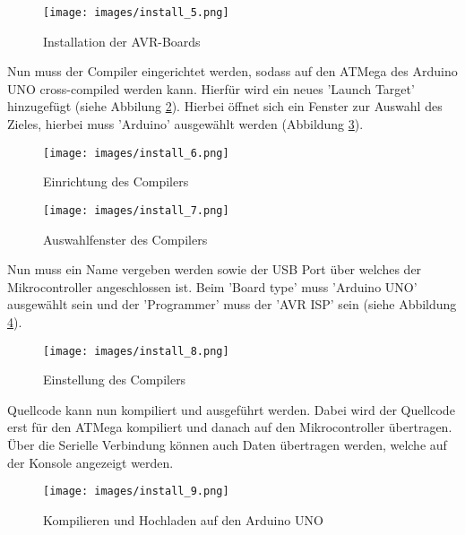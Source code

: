\begin{figure}[H]
    \caption{Installation der AVR-Boards}
    \centering
    \texttt{[image: images/install\_5.png]}
    \label{fig:avrboards}
\end{figure}

Nun muss der Compiler eingerichtet werden, sodass auf den ATMega des Arduino UNO cross-compiled werden kann. Hierfür wird ein neues 'Launch Target' hinzugefügt (siehe Abbilung \ref{fig:compiler}). Hierbei öffnet sich ein Fenster zur Auswahl des Zieles, hierbei muss 'Arduino' ausgewählt werden (Abbildung \ref{fig:selectcompiler}).

\begin{figure}[H]
    \caption{Einrichtung des Compilers}
    \centering
    \texttt{[image: images/install\_6.png]}
    \label{fig:compiler}
\end{figure}

\begin{figure}[H]
    \caption{Auswahlfenster des Compilers}
    \centering
    \texttt{[image: images/install\_7.png]}
    \label{fig:selectcompiler}
\end{figure}

Nun muss ein Name vergeben werden sowie der USB Port über welches der Mikrocontroller angeschlossen ist. Beim 'Board type' muss 'Arduino UNO' ausgewählt sein und der 'Programmer' muss der 'AVR ISP' sein (siehe Abbildung \ref{fig:settingcompiler}).

\begin{figure}[H]
    \caption{Einstellung des Compilers}
    \centering
    \texttt{[image: images/install\_8.png]}
    \label{fig:settingcompiler}
\end{figure}

Quellcode kann nun kompiliert und ausgeführt werden. Dabei wird der Quellcode erst für den ATMega kompiliert und danach auf den Mikrocontroller übertragen. Über die Serielle Verbindung können auch Daten übertragen werden, welche auf der Konsole angezeigt werden.

\begin{figure}[H]
    \caption{Kompilieren und Hochladen auf den Arduino UNO}
    \centering
    \texttt{[image: images/install\_9.png]}
    \label{fig:settheory}
\end{figure}

\vfill
\clearpage